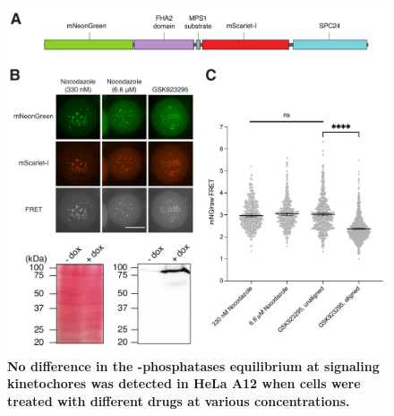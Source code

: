 \begin{figure}
    \centering
    \includegraphics[width=\textwidth]{chapters/figures/MPS1sen-KT.pdf}
    \caption{\textbf{No difference in the -phosphatases equilibrium at signaling kinetochores was detected in HeLa A12 when cells were treated with different drugs at various concentrations.}}
    \label{MPS1sen-KT}
\end{figure}
